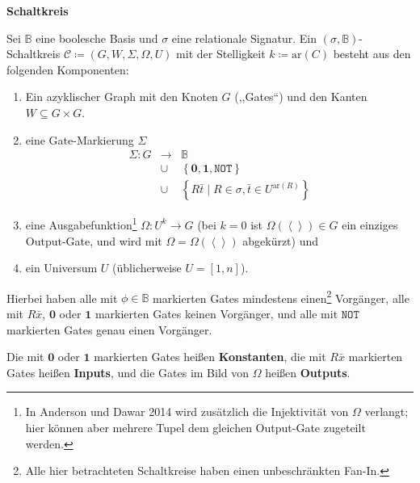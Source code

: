 \begin{defn}
\textbf{Schaltkreis}

Sei $\mathbb{B}$ eine boolesche Basis und $\sigma$ eine relationale
Signatur. Ein $\left(\sigma,\mathbb{B}\right)$-Schaltkreis $\mathcal{C}\coloneqq\left(G,W,\Sigma,\Omega,U\right)$
mit der Stelligkeit $k\coloneqq\mathrm{ar}\left(C\right)$ besteht
aus den folgenden Komponenten: 

\begin{enumerate}
\item Ein azyklischer Graph mit den Knoten $G$ (,,Gates``) und den Kanten
$W\subseteq G\times G$.
\item eine Gate-Markierung $\Sigma$ 
\begin{eqnarray*}
\Sigma:G & \rightarrow & \mathbb{B}\\
 & \cup & \left\{ \mathbf{0},\mathbf{1},\mathtt{NOT}\right\} \\
 & \cup & \left\{ R\bar{t}\mid R\in\sigma,\bar{t}\in U^{\mathrm{ar}\left(R\right)}\right\} 
\end{eqnarray*}
\item eine Ausgabefunktion\footnote{In Anderson und Dawar 2014\cite{AD2014} wird zusätzlich die Injektivität
von $\Omega$ verlangt; hier können aber mehrere Tupel dem gleichen
Output-Gate zugeteilt werden.} $\Omega:U^{k}\rightarrow G$ (bei $k=0$ ist $\Omega\left(\left\langle \right\rangle \right)\in G$
ein einziges Output-Gate, und wird mit $\Omega=\Omega\left(\left\langle \right\rangle \right)$
abgekürzt) und 
\item ein Universum $U$ (üblicherweise $U=\left[1,n\right]$).
\end{enumerate}
Hierbei haben alle mit $\phi\in\mathbb{B}$ markierten Gates mindestens
einen\footnote{Alle hier betrachteten Schaltkreise haben einen unbeschränkten Fan-In.}
Vorgänger, alle mit $R\bar{x}$, $\mathbf{0}$ oder $\mathbf{1}$
markierten Gates keinen\textbf{ }Vorgänger, und alle mit $\mathtt{NOT}$
markierten Gates genau\textbf{ }einen\textbf{ }Vorgänger.

Die mit $\mathbf{0}$ oder $\mathbf{1}$ markierten Gates heißen \textbf{Konstanten},
die mit $R\bar{x}$ markierten Gates heißen \textbf{Inputs}, und die
Gates im Bild von $\Omega$ heißen \textbf{Outputs}.
\end{defn}

